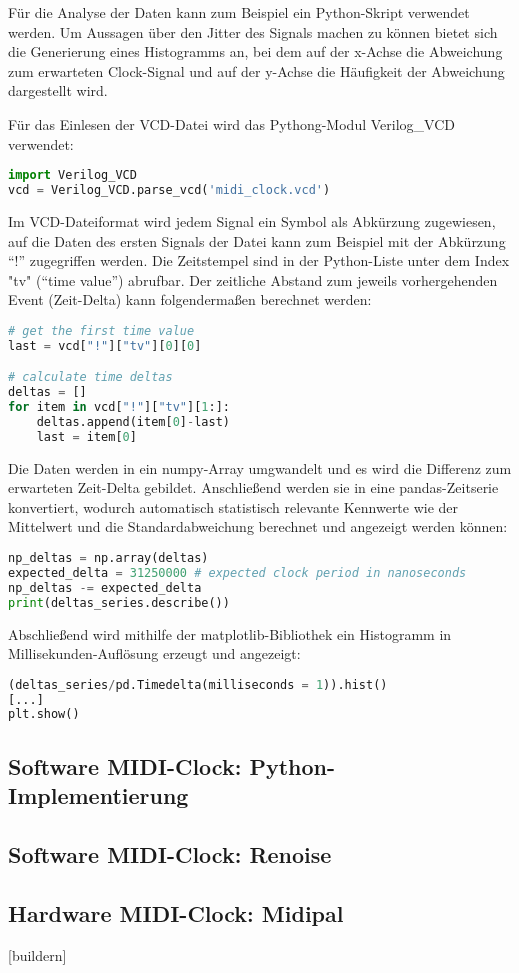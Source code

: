 Für die Analyse der Daten kann zum Beispiel ein Python-Skript verwendet werden. Um Aussagen über den Jitter des Signals machen zu können bietet sich die Generierung eines Histogramms an, bei dem auf der x-Achse die Abweichung zum erwarteten Clock-Signal und auf der y-Achse die Häufigkeit der Abweichung dargestellt wird.

Für das Einlesen der VCD-Datei wird das Pythong-Modul Verilog\_VCD verwendet:
\begin{lstlisting}[language=python]
import Verilog_VCD
vcd = Verilog_VCD.parse_vcd('midi_clock.vcd')
\end{lstlisting}

Im VCD-Dateiformat wird jedem Signal ein Symbol als Abkürzung zugewiesen, auf die Daten des ersten Signals der Datei kann zum Beispiel mit der Abkürzung ``!'' zugegriffen werden.
Die Zeitstempel sind in der Python-Liste unter dem Index "tv" (``time value'') abrufbar. 
Der zeitliche Abstand zum jeweils vorhergehenden Event (Zeit-Delta) kann folgendermaßen berechnet werden:
 
\begin{lstlisting}[language=python]
# get the first time value
last = vcd["!"]["tv"][0][0]

# calculate time deltas
deltas = []
for item in vcd["!"]["tv"][1:]: 
    deltas.append(item[0]-last)
    last = item[0]
\end{lstlisting}

Die Daten werden in ein numpy-Array umgwandelt und es wird die Differenz zum erwarteten Zeit-Delta gebildet. 
Anschließend werden sie in eine pandas-Zeitserie konvertiert, wodurch automatisch statistisch relevante Kennwerte wie der Mittelwert und die Standardabweichung berechnet und angezeigt werden können:
 
\begin{lstlisting}[language=python]
np_deltas = np.array(deltas)
expected_delta = 31250000 # expected clock period in nanoseconds
np_deltas -= expected_delta
print(deltas_series.describe())
\end{lstlisting}

Abschließend wird mithilfe der matplotlib-Bibliothek ein Histogramm in Millisekunden-Auflösung erzeugt und angezeigt:

\begin{lstlisting}[language=python]
(deltas_series/pd.Timedelta(milliseconds = 1)).hist()
[...]
plt.show()
\end{lstlisting}

\subsection{Software MIDI-Clock: Python-Implementierung}

\subsection{Software MIDI-Clock: Renoise}

\subsection{Hardware MIDI-Clock: Midipal}

[buildern]

